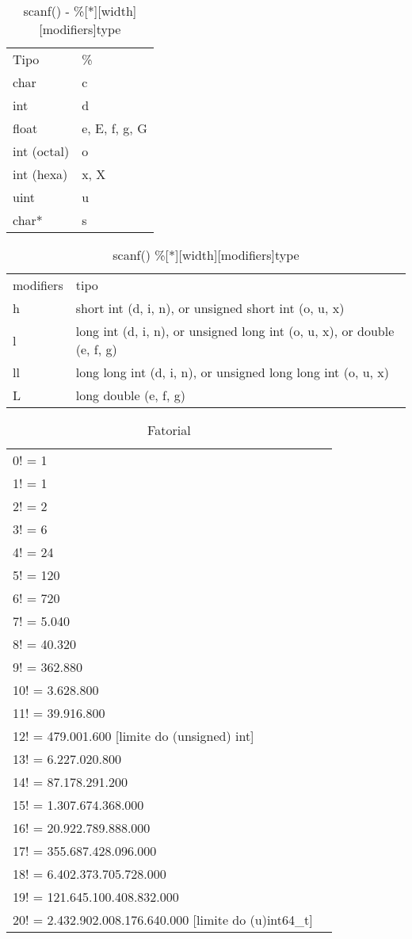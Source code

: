 \documentclass[a4paper,twocolumn, 10pt, landscape]{article}
\begin{document}
\begin{table}
\begin{tabular}{ll}
Tipo & \% \\ 
char & c \\ 
int & d \\ 
float & e, E, f, g, G \\ 
int (octal) & o \\ 
int (hexa) & x, X \\ 
uint & u \\ 
char* & s
\end{tabular}
\caption{scanf() - \%[*][width][modifiers]type}
\label{tipos}
\end{table}

\begin{table}
 \begin{tabular}{ll}
modifiers & tipo \\ 
h & short int (d, i, n), or unsigned short int (o, u, x) \\ 
l & long int (d, i, n), or unsigned long int (o, u, x), or double (e, f, g) \\ 
ll & long long int (d, i, n), or unsigned long long int (o, u, x) \\ 
L & long double (e, f, g) \\ 
\end{tabular}
\caption{scanf() \%[*][width][modifiers]type}
\label{modifiers}
\end{table}

\begin{table}[!h]
\begin{tabular}{ll}
0! = 1 \\
1! = 1 \\
2! = 2 \\
3! = 6 \\
4! = 24 \\
5! = 120 \\
6! = 720 \\
7! = 5.040 \\
8! = 40.320 \\
9! = 362.880 \\
10! = 3.628.800 \\
11! = 39.916.800 \\
12! = 479.001.600 [limite do (unsigned) int] \\
13! = 6.227.020.800 \\
14! = 87.178.291.200 \\
15! = 1.307.674.368.000 \\
16! = 20.922.789.888.000 \\
17! = 355.687.428.096.000 \\
18! = 6.402.373.705.728.000 \\
19! = 121.645.100.408.832.000 \\
20! = 2.432.902.008.176.640.000 [limite do (u)int64\_t] \\
\end{tabular}
\caption{Fatorial}
\label{Fatorial}
\end{table}
\end{document}
